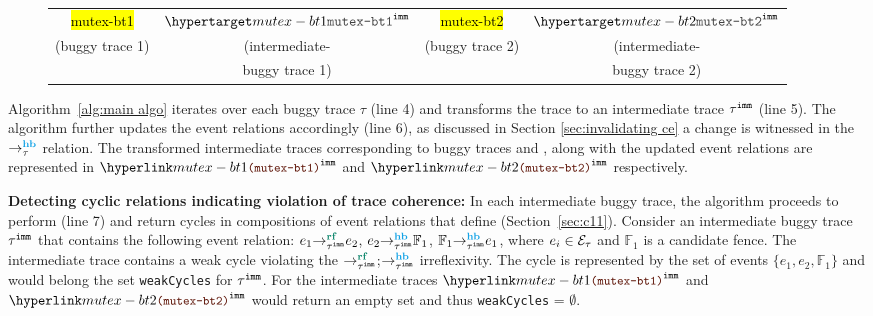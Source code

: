 \begin{figure}[!h]
	\begin{tabular}{|c|c|c|c|}
		\hline
		\resizebox{0.24\textwidth}{!}{} &
		\resizebox{0.24\textwidth}{!}{} &
		\resizebox{0.24\textwidth}{!}{} &
		\resizebox{0.24\textwidth}{!}{} \\
		\hline
		
		\multicolumn{1}{c}{\hl{mutex-bt1}} &
		\multicolumn{1}{c}{$\imm{\hl{mutex-bt1}}$}  &
		\multicolumn{1}{c}{\hl{mutex-bt2}} &
		\multicolumn{1}{c}{$\imm{\hl{mutex-bt2}}$} \\
		
		\multicolumn{1}{c}{(buggy trace 1)} &
		\multicolumn{1}{c}{(intermediate-} &
		\multicolumn{1}{c}{(buggy trace 2)} &
		\multicolumn{1}{c}{(intermediate-} \\
	
		\multicolumn{1}{c}{} &
		\multicolumn{1}{c}{buggy trace 1)} &
		\multicolumn{1}{c}{} &
		\multicolumn{1}{c}{buggy trace 2)} \\
	\end{tabular}
\end{figure}

Algorithm~\ref{alg:main algo} iterates over each buggy trace
$\tau$ (line 4) and transforms the trace to an intermediate 
trace ${\tau}^{\mathtt{imm}}$ (line 5). The algorithm further updates the 
event relations accordingly (line 6), as discussed in Section
\ref{sec:invalidating ce} a change is witnessed in the 
$\setHB$ relation. The transformed intermediate traces 
corresponding to buggy traces  and 
, along with the updated event relations are 
represented in $\imm{\hlref{mutex-bt1}}$ and 
$\imm{\hlref{mutex-bt2}}$ respectively.

\noindent
{\bf Detecting cyclic relations indicating violation of 
	trace coherence:}
In each intermediate buggy trace, the algorithm proceeds 
to perform \wkfence (line 7) and return cycles in compositions 
of event relations that define  
(Section~\ref{sec:c11}). 
%
Consider an intermediate buggy trace ${\tau}^{\mathtt{imm}}$ that 
contains the following event relation: 
$\rf{\imm{\tau}}{e_1}{e_2}$, $\hb{\imm{\tau}}{e_2}{\mathbb{F}_1}$,
$\hb{\imm{\tau}}{\mathbb{F}_1}{e_1}$, where $e_i \in 
\mathcal{E}_\tau$ and $\mathbb{F}_1$ is a candidate fence.
The intermediate trace contains a weak cycle violating
the $\rf{\imm{\tau}}{}{}$;$\hb{\imm{\tau}}{}{}$ 
irreflexivity. The cycle is represented by the set of events
$\{e_1, e_2, \mathbb{F}_1\}$ and would belong the set
{\tt weakCycles} for ${\tau}^{\mathtt{imm}}$.
%
For the intermediate traces 
$\imm{\hlref{mutex-bt1}}$ and $\imm{\hlref{mutex-bt2}}$
\wkfence would return an empty set and thus 
{\tt weakCycles} = $\emptyset$.

